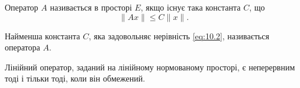 \begin{definition}
Оператор $A$ називається  в
просторі $E$, якщо існує така константа $C$, що 
\begin{equation}
    \label{eq:10.2}
    \|A x\| \le C \|x\|.
\end{equation}
\end{definition}

\begin{definition}
Найменша константа $C$,
яка задовольняє нерівність \eqref{eq:10.2},
називається  оператора $A$.
\end{definition}

\begin{theorem}
Лінійний оператор, заданий на лінійному
нормованому просторі, є неперервним тоді і тільки тоді,
коли він обмежений.
\end{theorem}

